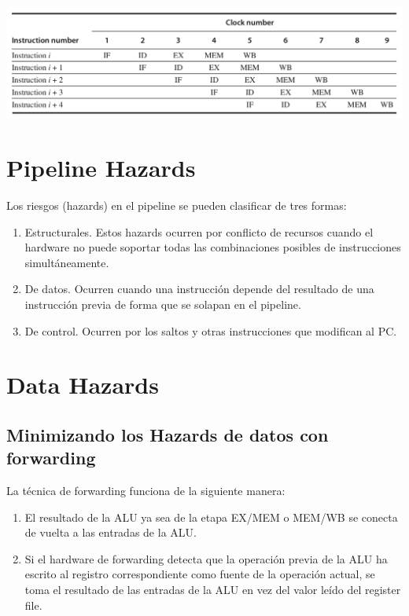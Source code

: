 \begin{center}
 \includegraphics[scale=.55,keepaspectratio=true]{gfx/pipeline1.png}
\end{center}


\section{Pipeline Hazards}
Los riesgos (hazards) en el pipeline se pueden clasificar de tres formas:

\begin{enumerate}
 \item Estructurales. Estos hazards ocurren por conflicto de recursos cuando el hardware no puede soportar todas las combinaciones posibles de instrucciones simultáneamente.
 \item De datos. Ocurren cuando una instrucción depende del resultado de una instrucción previa de forma que se solapan en el pipeline.
 \item De control. Ocurren por los saltos y otras instrucciones que modifican al PC.
\end{enumerate}

\section{Data Hazards}
\subsection{Minimizando los Hazards de datos con forwarding}

La técnica de forwarding funciona de la siguiente manera:

\begin{enumerate}
 \item El resultado de la ALU ya sea de la etapa EX/MEM o MEM/WB se conecta de vuelta a las entradas de la ALU.
 \item Si el hardware de forwarding detecta que la operación previa de la ALU ha escrito al registro correspondiente como fuente de la operación actual, se toma el resultado de las entradas de la ALU en vez del valor leído del register file.
\end{enumerate}
 

